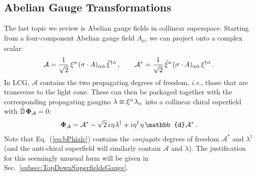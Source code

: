 \documentclass[12pt,document,nofootinbib,superscriptaddress,onecolumn,preprintnumbers,balancelastpage]{article}
\newcommand{\s}{\hspace{0.8pt}}
\newcommand{\PP}{\mathbb{d}}
\DeclareRobustCommand{\Sec}[1]{Sec.~\ref{#1}}
\DeclareRobustCommand{\Eq}[1]{Eq.~(\ref{#1})}
\newcommand{\bPhialc}{ \boldsymbol{\Phi}_\alc}
\newcommand{\D}{\mathbb{D}}
\newcommand{\alc}{\mathcal{A}}
\begin{document}
\begin{spacing}{1.2}
\subsection{Abelian Gauge Transformations}
\label{subsec:gaugetheoryReview}


The last topic we review is Abelian gauge fields in collinear superspace.
%
Starting from a four-component Abelian gauge field $A_\mu$, we can project onto a complex scalar: 
%
\begin{align}
\alc =\frac{1}{\sqrt{2}}\, \xi^\alpha\s (\sigma \cdot A )_{\alpha \dot{\alpha}}\, \tilde \xi^{\dagger \dot{\alpha}}\,, \qquad \alc^* = \frac{1}{\sqrt{2}}\, \tilde{\xi}^\alpha\s (\sigma \cdot A )_{\alpha \dot{\alpha}} \,\xi^{\dagger \dot{\alpha}}\,.
\end{align}
%
In LCG, $\alc$ contains the two propagating degrees of freedom, \emph{i.e.}, those that are transverse to the light cone.
%
These can then be packaged together with the corresponding propagating gaugino $\lambda \equiv \xi^\alpha\s \lambda_\alpha$ into a collinear chiral superfield with $\bar{\D}\s \bPhialc  = 0$: 
%
\begin{align}
\bPhialc = \alc^* - \sqrt{2} \, i\s \eta\s \lambda^\dagger + i \eta^\dagger\s \eta \, \PP\s \alc^*\,.
\label{eq:bPhialc}
\end{align}
%
Note that \Eq{eq:bPhialc} contains the \emph{conjugate} degrees of freedom $\alc^*$ and $\lambda^\dagger$ (and the anti-chiral superfield will similarly contain $\alc$ and $\lambda$).
%
The justification for this seemingly unusual form will be given in \Sec{subsec:TopDownSuperfieldsGauge}. 



\end{spacing}
\end{document}
